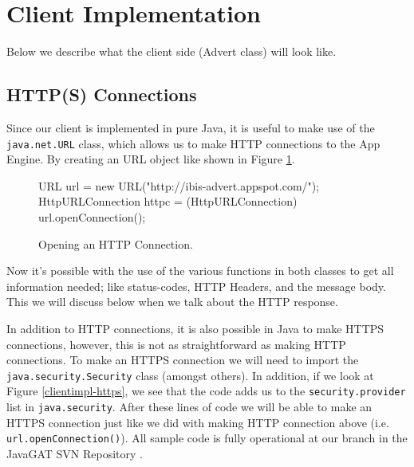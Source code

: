 \section{Client Implementation}
\label{clientimpl}
Below we describe what the client side (Advert class) will look like.

\subsection{HTTP(S) Connections}
Since our client is implemented in pure Java, it is useful to make use of the
\texttt{java.net.URL} class, which allows us to make HTTP connections to the
App Engine. By creating an URL object like shown in Figure \ref{clientimpl-url}.

\begin{figure}[ht] %
\begin{center}
\begin{code}
URL url = new URL("http://ibis-advert.appspot.com/");
HttpURLConnection httpc = (HttpURLConnection) url.openConnection();
\end{code}
\caption{Opening an HTTP Connection.\label{clientimpl-url}}
\end{center}
\end{figure}

Now it's possible with the use of the various functions in both classes to get
all information needed; like status-codes, HTTP Headers, and the message body.
This we will discuss below when we talk about the HTTP response.

In addition to HTTP connections, it is also possible in Java to make HTTPS
connections, however, this is not as straightforward as making HTTP connections.
To make an HTTPS connection we will need to import the
\texttt{java.security.Security} class (amongst others). In addition, if we look
at Figure \ref{clientimpl-https}, we see that the code adds us to the
\texttt{security.provider} list in \texttt{java.security}. After these lines of
code we will be able to make an HTTPS connection just like we did with making
HTTP connection above (i.e. \texttt{url.openConnection()}). All sample code is
fully operational at our branch in the JavaGAT SVN Repository .

